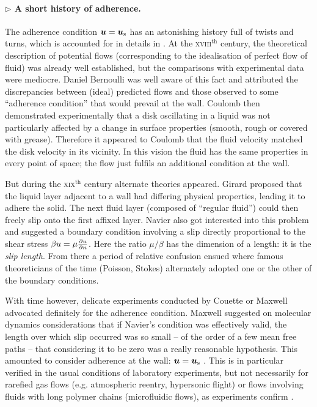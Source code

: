\paragraph{$\rhd$ A short history of adherence.} The adherence condition $\bu = \bu_\mathrm{s}$ has an astonishing history full of twists and turns, which is accounted for in details in \citet{Goldstein1950}. At the \textsc{xviii}$^\text{th}$ century, the theoretical description of potential flows (corresponding to the idealisation of perfect flow of fluid) was already well established, but the comparisons with experimental data were mediocre. Daniel Bernoulli was well aware of this fact and attributed the discrepancies between (ideal) predicted flows and those observed to some ``adherence condition'' that would prevail at the wall. Coulomb then demonstrated experimentally that a disk oscillating in a liquid was not particularly affected by a change in surface properties (smooth, rough or covered with grease). Therefore it appeared to Coulomb that the fluid velocity matched the disk velocity in its vicinity. In this vision the fluid has the same properties in every point of space; the flow just fulfils an additional condition at the wall.

But during the \textsc{xix}$^\text{th}$ century alternate theories appeared. Girard proposed that the liquid layer adjacent to a wall had differing physical properties, leading it to adhere the solid. The next fluid layer (composed of ``regular fluid'') could then freely slip onto the first affixed layer. Navier also got interested into this problem and suggested a boundary condition involving a slip directly proportional to the shear stress $\beta u = \mu \frac{\partial u}{\partial n}$. Here the ratio $\mu/\beta$ has the dimension of a length: it is the \textit{slip length}. From there a period of relative confusion ensued where famous theoreticians of the time (Poisson, Stokes) alternately adopted one or the other of the boundary conditions.

With time however, delicate experiments conducted by Couette or Maxwell advocated definitely for the adherence condition. Maxwell suggested on molecular dynamics considerations that if Navier's condition was effectively valid, the length over which slip occurred was so small -- of the order of a few mean free paths -- that considering it to be zero was a really reasonable hypothesis. This amounted to consider adherence at the wall: $\bu = \bu_\text s$ \citep{Maxwell1879}. This is in particular verified in the usual conditions of laboratory experiments, but not necessarily for rarefied gas flows (e.g. atmospheric reentry, hypersonic flight) or flows involving fluids with long polymer chains (microfluidic flows), as experiments confirm \citep{Henot2018}.

